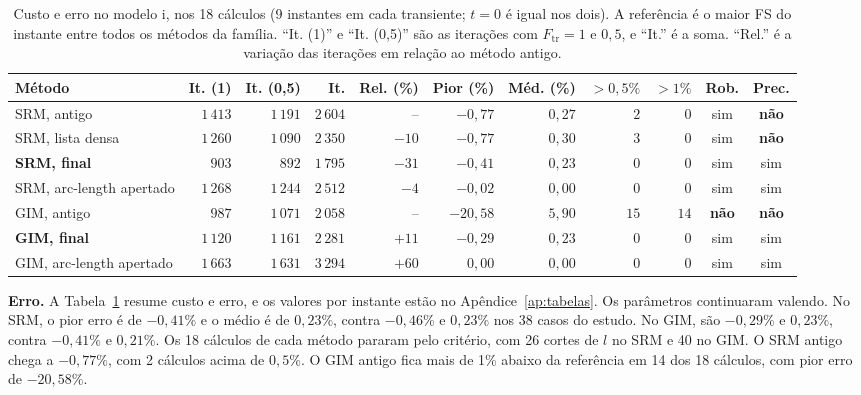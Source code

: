 \documentclass[11pt,a4paper]{article}
\numberwithin{equation}{section}
\begin{document}
\begin{table}[htbp]
\centering\footnotesize\setlength{\tabcolsep}{3pt}
\caption{Custo e erro no modelo i, nos 18 cálculos (9 instantes em cada transiente; $t = 0$ é igual nos dois). A referência é o maior FS do instante entre todos os métodos da família. ``It. (1)'' e ``It. (0,5)'' são as iterações com $F_{\mathrm{tr}} = 1$ e $0{,}5$, e ``It.'' é a soma. ``Rel.'' é a variação das iterações em relação ao método antigo.}\label{tab:acoplado_erro}
\begin{tabular}{p{3.7cm}rrrrrrrrcc}
\toprule
Método & It. (1) & It. (0,5) & It. & Rel. (\%) & Pior (\%) & Méd. (\%) & $>0{,}5\%$ & $>1\%$ & Rob. & Prec. \\
\midrule
SRM, antigo & $1\,413$ & $1\,191$ & $2\,604$ & -- & $-0{,}77$ & $0{,}27$ & $2$ & $0$ & sim & \textbf{não} \\
SRM, lista densa & $1\,260$ & $1\,090$ & $2\,350$ & $-10$ & $-0{,}77$ & $0{,}30$ & $3$ & $0$ & sim & \textbf{não} \\
\textbf{SRM, final} & $903$ & $892$ & $1\,795$ & $-31$ & $-0{,}41$ & $0{,}23$ & $0$ & $0$ & sim & sim \\
SRM, arc-length apertado & $1\,268$ & $1\,244$ & $2\,512$ & $-4$ & $-0{,}02$ & $0{,}00$ & $0$ & $0$ & sim & sim \\
\midrule
GIM, antigo & $987$ & $1\,071$ & $2\,058$ & -- & $-20{,}58$ & $5{,}90$ & $15$ & $14$ & \textbf{não} & \textbf{não} \\
\textbf{GIM, final} & $1\,120$ & $1\,161$ & $2\,281$ & $+$$11$ & $-0{,}29$ & $0{,}23$ & $0$ & $0$ & sim & sim \\
GIM, arc-length apertado & $1\,663$ & $1\,631$ & $3\,294$ & $+$$60$ & $0{,}00$ & $0{,}00$ & $0$ & $0$ & sim & sim \\
\bottomrule
\end{tabular}
\end{table}


\textbf{Erro.} A Tabela~\ref{tab:acoplado_erro} resume custo e erro, e os valores por instante estão no Apêndice~\ref{ap:tabelas}. Os parâmetros continuaram valendo. No SRM, o pior erro é de $-0{,}41\%$ e o médio é de $0{,}23\%$, contra $-0{,}46\%$ e $0{,}23\%$ nos 38 casos do estudo. No GIM, são $-0{,}29\%$ e $0{,}23\%$, contra $-0{,}41\%$ e $0{,}21\%$. Os 18 cálculos de cada método pararam pelo critério, com 26 cortes de $l$ no SRM e 40 no GIM. O SRM antigo chega a $-0{,}77\%$, com 2 cálculos acima de $0{,}5\%$. O GIM antigo fica mais de 1\% abaixo da referência em 14 dos 18 cálculos, com pior erro de $-20{,}58\%$.
\end{document}
